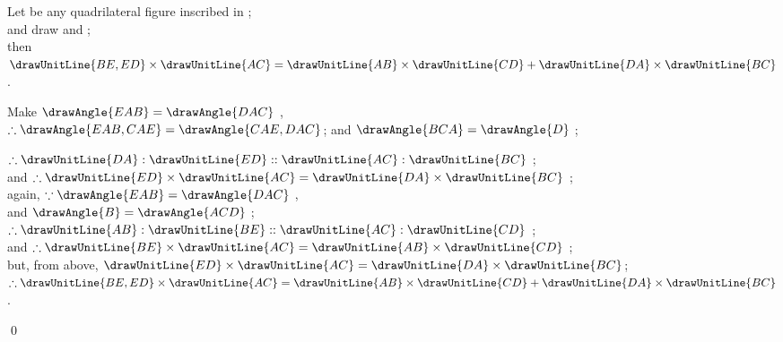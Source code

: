 \documentclass[booklanguage=english]{byrnebook}
\begin{document}
\begin{center}
Let  be any quadrilateral figure inscribed in ;\\
and draw  and ;\\
then $\drawUnitLine{BE,ED} \times \drawUnitLine{AC} = \drawUnitLine{AB} \times \drawUnitLine{CD} + \drawUnitLine{DA} \times \drawUnitLine{BC}$.

Make $\drawAngle{EAB} = \drawAngle{DAC}$ ,\\
$\therefore \drawAngle{EAB,CAE} = \drawAngle{CAE,DAC}$; and $\drawAngle{BCA} = \drawAngle{D}$ ;

$\therefore \drawUnitLine{DA} : \drawUnitLine{ED} :: \drawUnitLine{AC} : \drawUnitLine{BC}$ ;\\
and $\therefore \drawUnitLine{ED} \times \drawUnitLine{AC} = \drawUnitLine{DA} \times \drawUnitLine{BC}$ ;\\
again, $\because \drawAngle{EAB} = \drawAngle{DAC}$ \byref{\constref},\\ %
and $\drawAngle{B} = \drawAngle{ACD}$ ;\\
$\therefore \drawUnitLine{AB} : \drawUnitLine{BE} :: \drawUnitLine{AC} : \drawUnitLine{CD}$ ;\\
and $\therefore \drawUnitLine{BE} \times \drawUnitLine{AC} = \drawUnitLine{AB} \times \drawUnitLine{CD}$ ;\\
but, from above, $\drawUnitLine{ED} \times \drawUnitLine{AC} = \drawUnitLine{DA} \times \drawUnitLine{BC}$;\\
$\therefore \drawUnitLine{BE,ED} \times \drawUnitLine{AC} = \drawUnitLine{AB} \times \drawUnitLine{CD} + \drawUnitLine{DA} \times \drawUnitLine{BC}$ .
\end{center}

\qed

\tableofcontents
\end{document}
